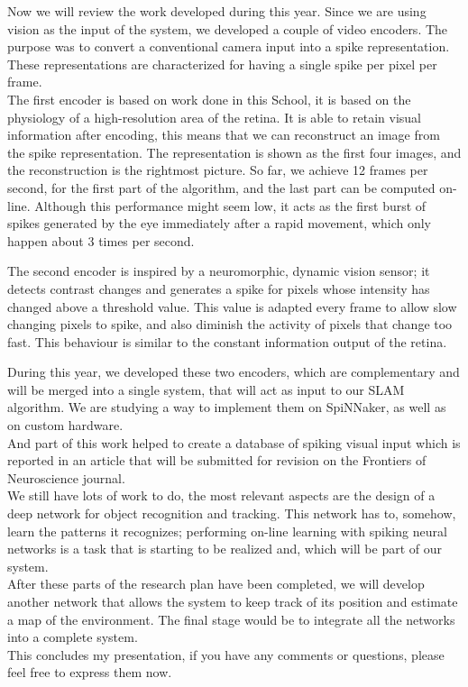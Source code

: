 \documentclass[12t,a4paper]{memoir}
\begin{document}
Now we will review the work developed during this year. Since we are using vision as the input of the system, we developed a couple of video encoders. The purpose was to convert a conventional camera input into a spike representation. These representations are characterized for having a single spike per pixel per frame.\\

The first encoder is based on work done in this School, it is based on the physiology of a high-resolution area of the retina. It is able to retain visual information after encoding, this means that we can reconstruct an image from the spike representation. The representation is shown as the first four images, and the reconstruction is the rightmost picture. So far, we achieve 12 frames per second, for the first part of the algorithm, and the last part can be computed on-line. Although this performance might seem low, it acts as the first burst of spikes generated by the eye immediately after a rapid movement, which only happen about 3 times per second.

The second encoder is inspired by a neuromorphic, dynamic vision sensor; it detects contrast changes and generates a spike for pixels whose intensity has changed above a threshold value. This value is adapted every frame to allow slow changing pixels to spike, and also diminish the activity of pixels that change too fast. This behaviour is similar to the constant information output of the retina.

During this year, we developed these two encoders, which are complementary and will be merged into a single system, that will act as input to our SLAM algorithm. We are studying a way to implement them on SpiNNaker, as well as on custom hardware.\\

And part of this work helped to create a database of spiking visual input which is reported in an article that will be submitted for revision on the Frontiers of Neuroscience journal.\\

We still have lots of work to do, the most relevant aspects are the design of a deep network for object recognition and tracking. This network has to, somehow, learn the patterns it recognizes; performing on-line learning with spiking neural networks is a task that is starting to be realized and, which will be part of our system. \\

After these parts of the research plan have been completed, we will develop another network  that allows the system to keep track of its position and estimate a map of the environment. The final stage would be to integrate all the networks into a complete system.\\

This concludes my presentation, if you have any comments or questions, please feel free to express them now.
\end{document}
